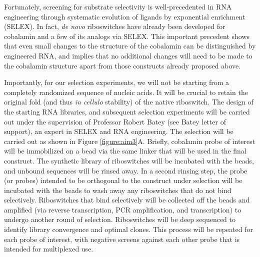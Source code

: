 Fortunately, screening for substrate selectivity is well-precedented in RNA engineering through systematic evolution of ligands by exponential enrichment (SELEX)\cite{MairalAptamersmoleculartools2008,ChoApplicationsAptamersSensors2009}.
In fact, \textit{de novo} riboswitches have already been developed for cobalamin and a few of its analogs via SELEX\cite{LorschvitroselectionRNA1994}. This important precedent shows that even small changes to the structure of the cobalamin can be distinguished by engineered RNA, and implies that no additional changes will need to be made to the cobalamin structure apart from those constructs already proposed above.

Importantly, for our selection experiments, we will not be starting from a completely randomized sequence of nucleic acids. It will be crucial to retain the original fold (and thus \textit{in cellulo} stability) of the native riboswitch. The design of the starting RNA libraries, and subsequent selection experiments will be carried out under the supervision of Professor Robert Batey (see Batey letter of support), an expert in SELEX and RNA engineering\cite{TrauschChapterThreeDesign2015}.
The selection will be carried out as shown in Figure \ref{figure:aim3}A. Briefly, cobalamin probe of interest will be immobilized on a bead via the same linker that will be used in the final construct. The synthetic library of riboswitches will be incubated with the beads, and unbound sequences will be rinsed away. In a second rinsing step, the probe (or probes) intended to be orthogonal to the construct under selection will be incubated with the beads to wash away any riboswitches that do not bind selectively. 
Riboswitches that bind selectively will be collected off the beads and amplified (via reverse transcription, PCR amplification, and transcription) to undergo another round of selection. Riboswitches will be deep sequenced to identify library convergence and optimal clones. This process will be repeated for each probe of interest, with negative screens against each other probe that is intended for multiplexed use.

